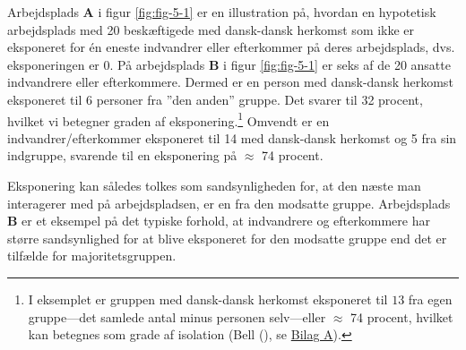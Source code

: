 \documentclass[
]{book}
\begin{document}
Arbejdsplads \textbf{A} i figur \ref{fig:fig-5-1} er en illustration på, hvordan en hypotetisk arbejdsplads med 20 beskæftigede med dansk-dansk herkomst som ikke er eksponeret for én eneste indvandrer eller efterkommer på deres arbejdsplads, dvs. eksponeringen er \(0\). På arbejdsplads \textbf{B} i figur \ref{fig:fig-5-1} er seks af de 20 ansatte indvandrere eller efterkommere. Dermed er en person med dansk-dansk herkomst eksponeret til 6 personer fra ''den anden'' gruppe. Det svarer til 32 procent, hvilket vi betegner graden af eksponering.\footnote{I eksemplet er gruppen med dansk-dansk herkomst eksponeret til \(13\) fra egen gruppe---det samlede antal minus personen selv---eller \(\approx\) 74 procent, hvilket kan betegnes som grade af isolation (Bell (), se \hyperref[bilagA]{Bilag A}).} Omvendt er en indvandrer/efterkommer eksponeret til 14 med dansk-dansk herkomst og 5 fra sin indgruppe, svarende til en eksponering på \(\approx\) 74 procent.

Eksponering kan således tolkes som sandsynligheden for, at den næste man interagerer med på arbejdspladsen, er en fra den modsatte gruppe. Arbejdsplads \textbf{B} er et eksempel på det typiske forhold, at indvandrere og efterkommere har større sandsynlighed for at blive eksponeret for den modsatte gruppe end det er tilfælde for majoritetsgruppen.
\end{document}
